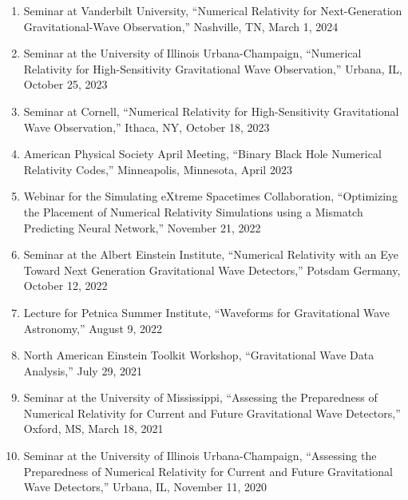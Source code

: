 \documentclass[11pt]{article}
\begin{document}
\begin{flushleft}
\begin{enumerate}
  \item Seminar at Vanderbilt University, ``Numerical Relativity for Next-Generation Gravitational-Wave Observation,'' Nashville, TN, March 1, 2024
  \item Seminar at the University of Illinois Urbana-Champaign, ``Numerical Relativity for High-Sensitivity Gravitational Wave Observation,'' Urbana, IL, October 25, 2023
  \item Seminar at Cornell, ``Numerical Relativity for High-Sensitivity Gravitational Wave Observation,'' Ithaca, NY, October 18, 2023
  \item American Physical Society April Meeting, ``Binary Black Hole Numerical Relativity Codes,'' Minneapolis, Minnesota, April 2023
  \item Webinar for the Simulating eXtreme Spacetimes Collaboration, ``Optimizing the Placement of Numerical Relativity Simulations using a Mismatch Predicting Neural Network,'' November 21, 2022
  \item Seminar at the Albert Einstein Institute, ``Numerical Relativity with an Eye Toward Next Generation Gravitational Wave Detectors,'' Potsdam Germany, October 12, 2022 
  \item Lecture for Petnica Summer Institute, ``Waveforms for Gravitational Wave Astronomy,'' August 9, 2022
  \item North American Einstein Toolkit Workshop, ``Gravitational Wave Data Analysis,'' July 29, 2021
  \item Seminar at the University of Mississippi, ``Assessing the Preparedness of Numerical Relativity for Current and Future Gravitational Wave Detectors,'' Oxford, MS, March 18, 2021
  \item Seminar at the University of Illinois Urbana-Champaign, ``Assessing the Preparedness of Numerical Relativity for Current and Future Gravitational Wave Detectors,'' Urbana, IL, November 11, 2020
  \end{enumerate}

\vspace{8px}


\end{flushleft}
\end{document}
